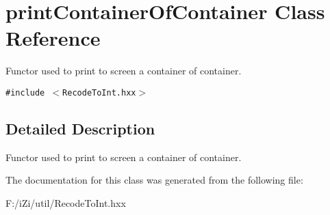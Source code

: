 \section{print\-Container\-Of\-Container Class Reference}
\label{classprint_container_of_container}
Functor used to print to screen a container of container.  


{\tt \#include $<$Recode\-To\-Int.hxx$>$}



\subsection{Detailed Description}
Functor used to print to screen a container of container. 



The documentation for this class was generated from the following file:\begin{CompactItemize}
\item 
F:/i\-Zi/util/Recode\-To\-Int.hxx\end{CompactItemize}
